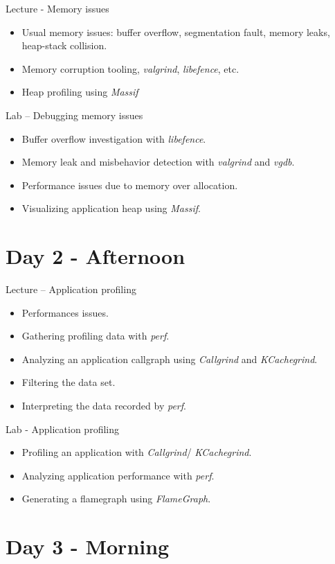 \documentclass[a4paper,12pt,obeyspaces,spaces,hyphens]{article}
\begin{document}
\feagendatwocolumn
{Lecture - Memory issues}
{
  \begin{itemize}
  \item Usual memory issues: buffer overflow, segmentation fault,
    memory leaks, heap-stack collision.
  \item Memory corruption tooling, {\em valgrind}, {\em libefence},
    etc.
  \item Heap profiling using {\em Massif}
  \end{itemize}
}
{Lab – Debugging memory issues}
{
  \begin{itemize}
  \item Buffer overflow investigation with {\em libefence}.
  \item Memory leak and misbehavior detection with {\em valgrind} and
    {\em vgdb}.
  \item Performance issues due to memory over allocation.
  \item Visualizing application heap using {\em Massif}.
  \end{itemize}
}

\section{Day 2 - Afternoon}

\feagendatwocolumn
{Lecture – Application profiling}
{
  \begin{itemize}
  \item Performances issues.
  \item Gathering profiling data with {\em perf}.
  \item Analyzing an application callgraph using {\em Callgrind}
    and {\em KCachegrind}.
  \item Filtering the data set.
  \item Interpreting the data recorded by {\em perf}.
  \end{itemize}
}
{Lab - Application profiling}
{
  \begin{itemize}
  \item Profiling an application with {\em Callgrind}/{\em
      KCachegrind}.
  \item Analyzing application performance with {\em perf}.
  \item Generating a flamegraph using {\em FlameGraph}.
  \end{itemize}
}

\section{Day 3 - Morning}
\end{document}
